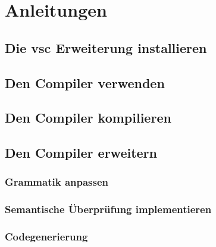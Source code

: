 \chapter{Anleitungen}

\section{Die \acs{vsc} Erweiterung installieren}

\section{Den Compiler verwenden}

\section{Den Compiler kompilieren}

\section{Den Compiler erweitern} 
\subsection{Grammatik anpassen}

\subsection{Semantische Überprüfung implementieren}

\subsection{Codegenerierung}